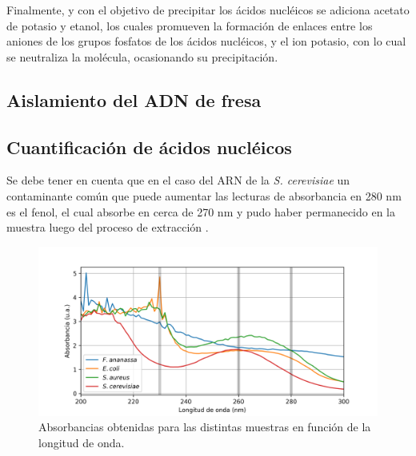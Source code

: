 \documentclass[fleqn,10pt]{SelfArx}
\begin{document}
		Finalmente, y con el objetivo de precipitar los \'acidos nucl\'eicos se adiciona acetato de potasio y etanol, los cuales promueven la formaci\'on de enlaces entre los aniones de los grupos fosfatos de los \'acidos nucl\'eicos, y el ion potasio, con lo cual se neutraliza la mol\'ecula, ocasionando su precipitaci\'on.
		
		
		
	\subsection{Aislamiento del ADN de fresa}
	
	\subsection{Cuantificaci\'on de \'acidos nucl\'eicos}
		Se debe tener en cuenta que en el caso del ARN de la \textit{S. cerevisiae} un contaminante com\'un que puede aumentar las lecturas de absorbancia en 280 nm es el fenol, el cual absorbe en cerca de 270 nm y pudo haber permanecido en la muestra luego del proceso de extracci\'on \cite{toni2018optimization}.
		
	\begin{figure}[h]
		\centering
		\includegraphics[width=\linewidth]{plots}
		\caption{Absorbancias obtenidas para las distintas muestras en funci\'on de la longitud de onda.}
	\end{figure}
\end{document}
